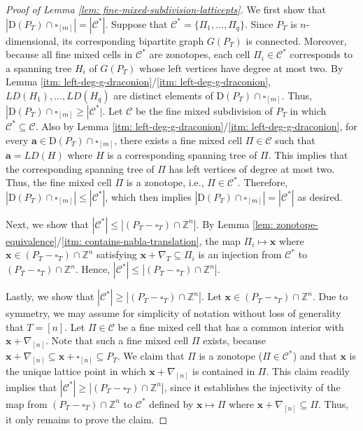 \documentclass[12pt,reqno]{article}%
\theoremstyle{definition}
\numberwithin{equation}{section}
\newcommand{\bba}{\mathbf{a}}
\newcommand{\bbx}{\mathbf{x}}
\newcommand{\Z}{\mathbb Z}
\newcommand{\calC}{\mathcal{C}}
\begin{document}
\begin{proof}[Proof of Lemma \ref{lem: fine-mixed-subdivision-latticepts}]
     We first show that $|\mathrm{D}(P_T)\cap \square_{[m]}|= |\calC^*|$. Suppose that $\calC^* = \{\Pi_1, \dots, \Pi_q\}$. Since $P_T$ is $n$-dimensional, its corresponding bipartite graph $G(P_T)$ is connected. Moreover, because all fine mixed cells in $\calC^*$ are zonotopes, each cell $\Pi_i \in \calC^*$ corresponds to a spanning tree $H_i$ of $G(P_T)$ whose left vertices have degree at most two. By Lemma \ref{itm: left-deg-g-draconion}/\ref{itm: left-deg-g-draconion}, $LD(H_1), \dots, LD(H_q) $ are distinct elements of $\mathrm{D}(P_T)\cap \square_{[m]}$. Thus, $|\mathrm{D}(P_T)\cap \square_{[m]} \geq |\calC^*|$. Let $\calC$ be the fine mixed subdivision of $P_T$ in which $\calC^* \subseteq \calC$. Also by Lemma \ref{itm: left-deg-g-draconion}/\ref{itm: left-deg-g-draconion}, for every $\bba \in \mathrm{D}(P_T)\cap \square_{[m]}$, there exists a fine mixed cell $\Pi \in \calC$ such that $\bba = LD(H)$ where $H$ is a corresponding spanning tree of $\Pi$. This implies that the corresponding spanning tree of $\Pi$ has left vertices of degree at most two. Thus, the fine mixed cell $\Pi$ is a zonotope, i.e., $\Pi \in \calC^*.$ Therefore, $|\mathrm{D}(P_T)\cap \square_{[m]}| \leq |\calC^*|$, which then implies $|\mathrm{D}(P_T)\cap \square_{[m]}|= |\calC^*|$ as desired.

    Next, we show that $|\calC^*| \leq |(P_T - \square_T)\cap \Z^n|.$ By Lemma \ref{lem: zonotope-equivalence}/\eqref{itm: contains-nabla-translation}, the map $\Pi_i \mapsto \bbx$ where $\bbx \in (P_T - \square_T)\cap \Z^n$ satisfying $\bbx + \nabla_T \subseteq \Pi_i$ is an injection from $\calC^*$ to $(P_T - \square_T)\cap \Z^n$. Hence, $|\calC^*| \leq |(P_T - \square_T)\cap \Z^n|.$

    Lastly, we show that $|\calC^*| \geq |(P_T - \square_T)\cap \Z^n|.$ Let $\bbx \in (P_T - \square_T)\cap \Z^n.$ Due to symmetry, we may assume for simplicity of notation without loss of generality that $T = [n]$. Let $\Pi \in \calC$ be a fine mixed cell that has a common interior with $\bbx + \nabla_{[n]}.$ Note that such a fine mixed cell $\Pi$ exists, because $\bbx + \nabla_{[n]} \subseteq \bbx + \square_{[n]} \subseteq P_T$. We claim that $\Pi$ is a zonotope ($\Pi \in \calC^*$) and that $\bbx$ is the unique lattice point in which $\bbx + \nabla_{[n]}$ is contained in $\Pi$. This claim readily implies that $|\calC^*| \geq |(P_T - \square_T)\cap \Z^n|$, since it establishes the injectivity of the map from $(P_T - \square_T)\cap \Z^n$ to $\calC^*$ defined by $\bbx \mapsto \Pi$ where $\bbx + \nabla_{[n]} \subseteq \Pi$. Thus, it only remains to prove the claim.
    

\end{proof}
\end{document}

